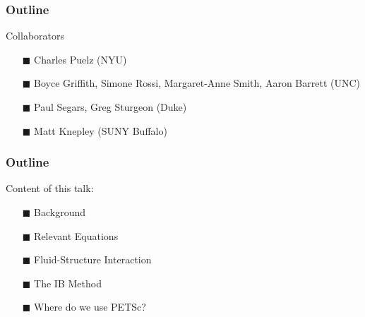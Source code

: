 \documentclass[8pt]{beamer}
\begin{document}




\begin{frame}
    \frametitle{Outline}
    Collaborators
    \begin{itemize}
    \item[$\blacksquare$] Charles Puelz (NYU)                                 \\
    \item[$\blacksquare$] Boyce Griffith, Simone Rossi, Margaret-Anne Smith,
    Aaron Barrett (UNC)                                                       \\
    \item[$\blacksquare$] Paul Segars, Greg Sturgeon (Duke)
    \item[$\blacksquare$] Matt Knepley (SUNY Buffalo)                         \\
    \end{itemize}
\end{frame}

\begin{frame}
    \frametitle{Outline}
    Content of this talk:
    \begin{itemize}
    \item[$\blacksquare$] Background                                          \\
    \item[$\blacksquare$] Relevant Equations                                  \\
    \item[$\blacksquare$] Fluid-Structure Interaction                         \\
    \item[$\blacksquare$] The IB Method                                       \\
    \item[$\blacksquare$] Where do we use PETSc?                              \\
    \end{itemize}
\end{frame}
\end{document}
